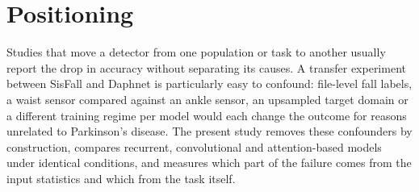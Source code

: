 \section{Positioning}

Studies that move a detector from one population or task to another usually report the drop in
accuracy without separating its causes. A transfer experiment between SisFall and Daphnet is
particularly easy to confound: file-level fall labels, a waist sensor compared against an ankle
sensor, an upsampled target domain or a different training regime per model would each change the
outcome for reasons unrelated to Parkinson's disease. The present study removes these confounders
by construction, compares recurrent, convolutional and attention-based models under identical
conditions, and measures which part of the failure comes from the input statistics and which from
the task itself.
